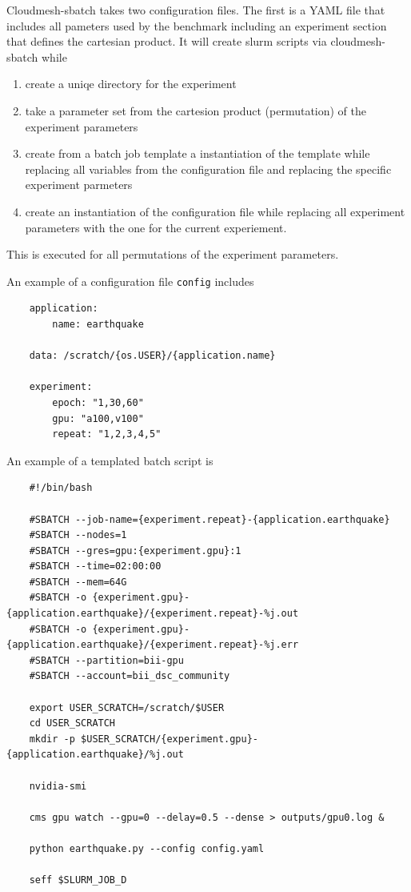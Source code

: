 \documentclass[utf8]{FrontiersinVancouver} %
\begin{document}
Cloudmesh-sbatch takes two configuration files. The first is a YAML
file that includes all pameters used by the benchmark including an
experiment section that defines the cartesian product. It will 
create slurm scripts via cloudmesh-sbatch while

\begin{enumerate}
  \item create a uniqe directory for the experiment
  \item take a parameter set from the cartesion product (permutation)
    of the experiment parameters
  \item create from a batch job template a instantiation of the
    template while replacing all variables from the configuration file
    and replacing the specific experiment parmeters
  \item create an instantiation of the configuration file while replacing all experiment parameters with the one for the current experiement.
\end{enumerate}

This is executed for all permutations of the experiment parameters.

An example of a configuration file \verb|config| includes

{\footnotesize
\begin{Verbatim}
    application:
        name: earthquake

    data: /scratch/{os.USER}/{application.name}
       
    experiment:
        epoch: "1,30,60"
        gpu: "a100,v100"
        repeat: "1,2,3,4,5"
\end{Verbatim}
}

An example of a templated batch script is

{\footnotesize
\begin{Verbatim}
    #!/bin/bash

    #SBATCH --job-name={experiment.repeat}-{application.earthquake}
    #SBATCH --nodes=1
    #SBATCH --gres=gpu:{experiment.gpu}:1
    #SBATCH --time=02:00:00
    #SBATCH --mem=64G
    #SBATCH -o {experiment.gpu}-{application.earthquake}/{experiment.repeat}-%j.out
    #SBATCH -o {experiment.gpu}-{application.earthquake}/{experiment.repeat}-%j.err
    #SBATCH --partition=bii-gpu
    #SBATCH --account=bii_dsc_community

    export USER_SCRATCH=/scratch/$USER
    cd USER_SCRATCH
    mkdir -p $USER_SCRATCH/{experiment.gpu}-{application.earthquake}/%j.out

    nvidia-smi

    cms gpu watch --gpu=0 --delay=0.5 --dense > outputs/gpu0.log &

    python earthquake.py --config config.yaml

    seff $SLURM_JOB_D
\end{Verbatim}
}
\end{document}

